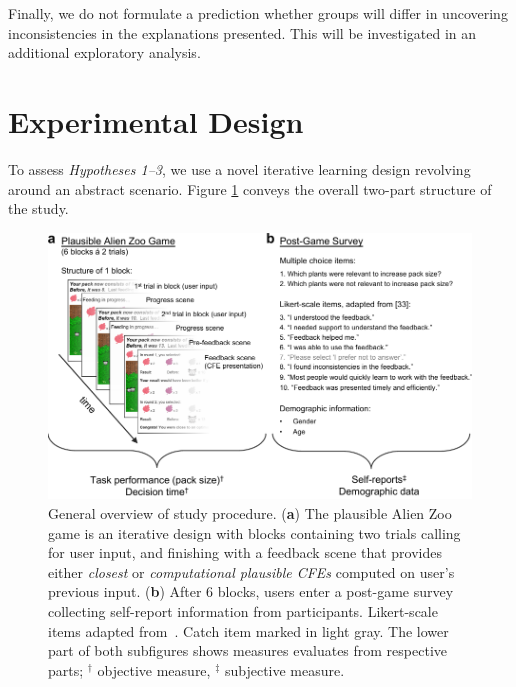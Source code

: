 Finally, we do not formulate a prediction whether groups will differ in uncovering inconsistencies in the explanations presented. This will be investigated in an additional exploratory analysis.%

\section{Experimental Design}\label{sec:experimental-design}

To assess \textit{Hypotheses 1--3}, we use a novel iterative learning design revolving around an abstract scenario. Figure \ref{fig:StudyStructure} conveys the overall two-part structure of the study.

\begin{figure}
   \centering
   \includegraphics[width=\textwidth]{./media/FigureStudyStructure.pdf}
   \caption{General overview of study procedure. (\textbf{a}) The plausible Alien Zoo game is an iterative design with blocks containing two trials calling for user input, and finishing with a feedback scene that provides either \textit{closest} or \textit{computational plausible \glspl{CFE}} computed on user's previous input. (\textbf{b}) After 6 blocks, users enter a post-game survey collecting self-report information from participants. Likert-scale items adapted from~\citep{holzinger_measuring_2020}. Catch item marked in light gray. The lower part of both subfigures shows measures evaluates from respective parts; $^\dag$ objective measure, $^\ddag$ subjective measure.}
   \label{fig:StudyStructure}
 \end{figure}

